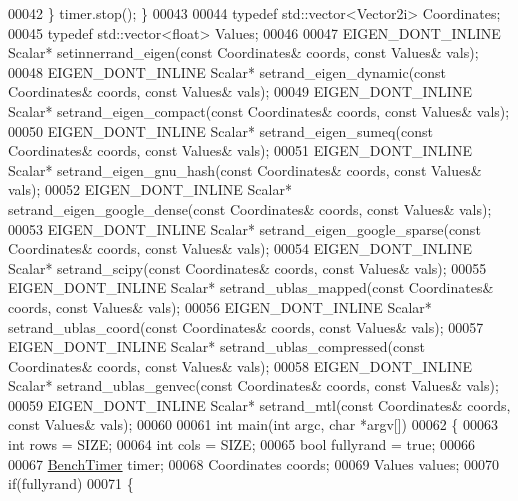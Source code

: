 \begin{DoxyCode}
00042 \textcolor{preprocessor}{  \} timer.stop(); \}}
00043 
00044 \textcolor{keyword}{typedef} std::vector<Vector2i> Coordinates;
00045 \textcolor{keyword}{typedef} std::vector<float> Values;
00046 
00047 EIGEN\_DONT\_INLINE Scalar* setinnerrand\_eigen(\textcolor{keyword}{const} Coordinates& coords, \textcolor{keyword}{const} Values& vals);
00048 EIGEN\_DONT\_INLINE Scalar* setrand\_eigen\_dynamic(\textcolor{keyword}{const} Coordinates& coords, \textcolor{keyword}{const} Values& vals);
00049 EIGEN\_DONT\_INLINE Scalar* setrand\_eigen\_compact(\textcolor{keyword}{const} Coordinates& coords, \textcolor{keyword}{const} Values& vals);
00050 EIGEN\_DONT\_INLINE Scalar* setrand\_eigen\_sumeq(\textcolor{keyword}{const} Coordinates& coords, \textcolor{keyword}{const} Values& vals);
00051 EIGEN\_DONT\_INLINE Scalar* setrand\_eigen\_gnu\_hash(\textcolor{keyword}{const} Coordinates& coords, \textcolor{keyword}{const} Values& vals);
00052 EIGEN\_DONT\_INLINE Scalar* setrand\_eigen\_google\_dense(\textcolor{keyword}{const} Coordinates& coords, \textcolor{keyword}{const} Values& vals);
00053 EIGEN\_DONT\_INLINE Scalar* setrand\_eigen\_google\_sparse(\textcolor{keyword}{const} Coordinates& coords, \textcolor{keyword}{const} Values& vals);
00054 EIGEN\_DONT\_INLINE Scalar* setrand\_scipy(\textcolor{keyword}{const} Coordinates& coords, \textcolor{keyword}{const} Values& vals);
00055 EIGEN\_DONT\_INLINE Scalar* setrand\_ublas\_mapped(\textcolor{keyword}{const} Coordinates& coords, \textcolor{keyword}{const} Values& vals);
00056 EIGEN\_DONT\_INLINE Scalar* setrand\_ublas\_coord(\textcolor{keyword}{const} Coordinates& coords, \textcolor{keyword}{const} Values& vals);
00057 EIGEN\_DONT\_INLINE Scalar* setrand\_ublas\_compressed(\textcolor{keyword}{const} Coordinates& coords, \textcolor{keyword}{const} Values& vals);
00058 EIGEN\_DONT\_INLINE Scalar* setrand\_ublas\_genvec(\textcolor{keyword}{const} Coordinates& coords, \textcolor{keyword}{const} Values& vals);
00059 EIGEN\_DONT\_INLINE Scalar* setrand\_mtl(\textcolor{keyword}{const} Coordinates& coords, \textcolor{keyword}{const} Values& vals);
00060 
00061 \textcolor{keywordtype}{int} main(\textcolor{keywordtype}{int} argc, \textcolor{keywordtype}{char} *argv[])
00062 \{
00063   \textcolor{keywordtype}{int} rows = SIZE;
00064   \textcolor{keywordtype}{int} cols = SIZE;
00065   \textcolor{keywordtype}{bool} fullyrand = \textcolor{keyword}{true};
00066 
00067   \hyperlink{class_eigen_1_1_bench_timer}{BenchTimer} timer;
00068   Coordinates coords;
00069   Values values;
00070   \textcolor{keywordflow}{if}(fullyrand)
00071   \{

\end{DoxyCode}
